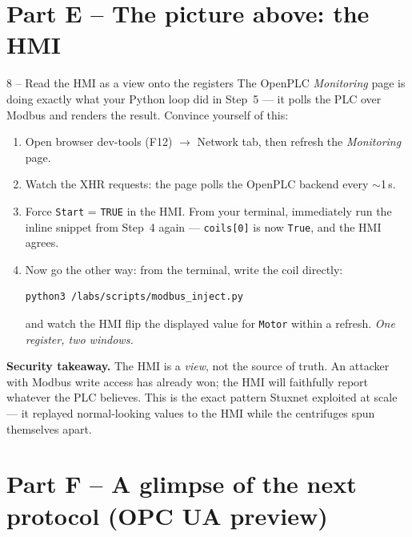 \documentclass[11pt,a4paper]{article}
\begin{document}
\section*{Part E -- The picture above: the HMI}

\begin{stepbox}{8 -- Read the HMI as a view onto the registers}
The OpenPLC \emph{Monitoring} page is doing exactly what your Python loop did in Step~5 --- it polls the PLC over Modbus and renders the result. Convince yourself of this:
\begin{enumerate}\setlength{\itemsep}{1pt}
  \item Open browser dev-tools (\textsf{F12}) $\to$ Network tab, then refresh the \emph{Monitoring} page.
  \item Watch the XHR requests: the page polls the OpenPLC backend every $\sim$1\,s.
  \item Force \texttt{Start} = \texttt{TRUE} in the HMI. From your terminal, immediately run the inline snippet from Step~4 again --- \texttt{coils[0]} is now \texttt{True}, and the HMI agrees.
  \item Now go the other way: from the terminal, write the coil directly:
\begin{lstlisting}[language=bash]
python3 /labs/scripts/modbus_inject.py
\end{lstlisting}
        and watch the HMI flip the displayed value for \texttt{Motor} within a refresh. \emph{One register, two windows.}
\end{enumerate}

\noindent\textbf{Security takeaway.} The HMI is a \emph{view}, not the source of truth. An attacker with Modbus write access has already won; the HMI will faithfully report whatever the PLC believes. This is the exact pattern Stuxnet exploited at scale --- it replayed normal-looking values to the HMI while the centrifuges spun themselves apart.
\end{stepbox}

\section*{Part F -- A glimpse of the next protocol (OPC UA preview)}
\end{document}
